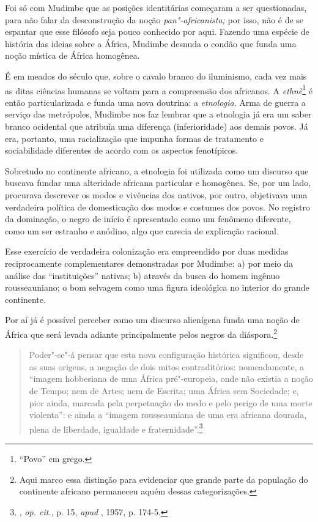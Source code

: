 Foi só com Mudimbe que as posições identitárias começaram a ser
questionadas, para não falar da desconstrução da noção
\emph{pan"-africanista;} por isso, não é de se espantar que esse filósofo
seja pouco conhecido por aqui. Fazendo uma espécie de história das
ideias sobre a África, Mudimbe desnuda o condão que funda uma noção
mística de África homogênea.

É em meados do século  que, sobre o cavalo branco do iluminismo, cada
vez mais as ditas ciências humanas se voltam para a compreensão dos
africanos. A \emph{ethnè}\footnote{``Povo'' em grego.} é então
particularizada e funda uma nova doutrina: a \emph{etnologia}. Arma de
guerra a serviço das metrópoles, Mudimbe nos faz lembrar que a etnologia
já era um saber branco ocidental que atribuía uma diferença
(inferioridade) aos demais povos. Já era, portanto, uma racialização que
impunha formas de tratamento e sociabilidade diferentes de acordo com os
aspectos fenotípicos.

Sobretudo no continente africano, a etnologia foi utilizada como um
discurso que buscava fundar uma alteridade africana particular e
homogênea. Se, por um lado, procurava descrever os modos e vivências dos
nativos, por outro, objetivava uma verdadeira política de domesticação
dos modos e costumes dos povos. No registro da dominação, o negro de
início é apresentado como um fenômeno diferente, como um ser estranho e
anódino, algo que carecia de explicação racional.

Esse exercício de verdadeira colonização era empreendido por duas
medidas reciprocamente complementares demonstradas por Mudimbe:
a) por meio da análise das ``instituições'' nativas; b)
através da busca do homem ingênuo rousseauniano; o bom selvagem como uma
figura ideológica no interior do grande continente.

Por aí já é possível perceber como um discurso alienígena funda uma
noção de África que será levada adiante principalmente pelos negros da
diáspora.\footnote{Aqui marco essa distinção para evidenciar que grande
  parte da população do continente africano permaneceu aquém dessas
  categorizações.}

\begin{quote}
Poder"-se"-á pensar que esta nova configuração histórica significou, desde
as suas origens, a negação de dois mitos contraditórios: nomeadamente, a
``imagem hobbesiana de uma África pré"-europeia, onde não existia a noção
de Tempo; nem de Artes; nem de Escrita; uma África sem Sociedade; e,
pior ainda, marcada pela perpetuação do medo e pelo perigo de uma morte
violenta'': e ainda a ``imagem rousseauniana de uma era africana
dourada, plena de liberdade, igualdade e fraternidade''.\footnote{,
  \emph{op. cit.}, p. 15, \emph{apud} , 1957, p. 174-5.}
\end{quote}

